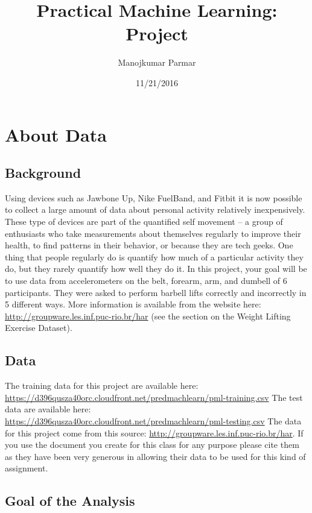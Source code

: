 \documentclass[]{article}
\title{Practical Machine Learning: Project}
\author{Manojkumar Parmar}
\date{11/21/2016}
\begin{document}
\maketitle

{
\setcounter{tocdepth}{6}
\tableofcontents
}
\section{About Data}\label{about-data}

\subsection{Background}\label{background}

Using devices such as Jawbone Up, Nike FuelBand, and Fitbit it is now
possible to collect a large amount of data about personal activity
relatively inexpensively. These type of devices are part of the
quantified self movement -- a group of enthusiasts who take measurements
about themselves regularly to improve their health, to find patterns in
their behavior, or because they are tech geeks. One thing that people
regularly do is quantify how much of a particular activity they do, but
they rarely quantify how well they do it. In this project, your goal
will be to use data from accelerometers on the belt, forearm, arm, and
dumbell of 6 participants. They were asked to perform barbell lifts
correctly and incorrectly in 5 different ways. More information is
available from the website here:
\url{http://groupware.les.inf.puc-rio.br/har} (see the section on the
Weight Lifting Exercise Dataset).

\subsection{Data}\label{data}

The training data for this project are available here:
\url{https://d396qusza40orc.cloudfront.net/predmachlearn/pml-training.csv}
The test data are available here:
\url{https://d396qusza40orc.cloudfront.net/predmachlearn/pml-testing.csv}
The data for this project come from this source:
\url{http://groupware.les.inf.puc-rio.br/har}. If you use the document
you create for this class for any purpose please cite them as they have
been very generous in allowing their data to be used for this kind of
assignment.

\subsection{Goal of the Analysis}\label{goal-of-the-analysis}
\end{document}
